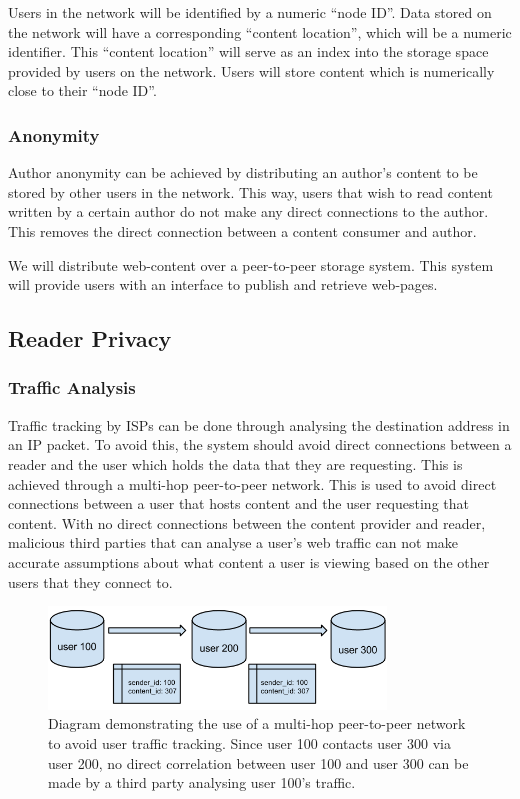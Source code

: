 Users in the network will be identified by a numeric ``node ID''. Data stored on the network will have a
corresponding ``content location'', which will be a numeric identifier. This ``content location'' will
serve as an index into the storage space provided by users on the network. Users will store content which
is numerically close to their ``node ID''.

\subsubsection{Anonymity}

Author anonymity can be achieved by distributing an author's content to be stored by other users in the network.
This way, users that wish to read content written by a certain author do not make any direct connections to
the author. This removes the direct connection between a content consumer and author.

We will distribute web-content over a peer-to-peer storage system. This system will provide users with an
interface to publish and retrieve web-pages.


\subsection{Reader Privacy}

\subsubsection{Traffic Analysis}

Traffic tracking by ISPs can be done through analysing the destination address in an IP packet. To avoid this,
the system should avoid direct connections between a reader and the user which holds the data that they are
requesting. This is achieved through a multi-hop peer-to-peer network. This is used to avoid direct connections
between a user that hosts content and the user requesting that content. With no direct connections between
the content provider and reader, malicious third parties that can analyse a user's web traffic can not make
accurate assumptions about what content a user is viewing based on the other users that they connect to.

\begin{figure}[H]
    \centering
    \includegraphics[width=0.8\textwidth]{img/indirection.png}
    \caption{Diagram demonstrating the use of a multi-hop peer-to-peer network to avoid user traffic tracking.
    Since user 100 contacts user 300 via user 200, no direct correlation between user 100 and user 300 can be made
by a third party analysing user 100's traffic.}
    \label{fig:multi-hop}
\end{figure}

